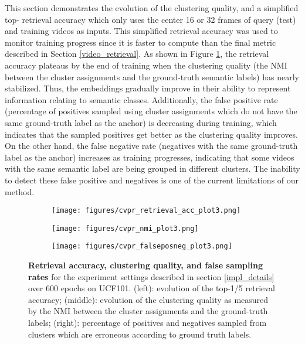 \documentclass[10pt,twocolumn,letterpaper]{article}
\begin{document}
\label{cluster_quality}
This section demonstrates the evolution of the clustering quality, and a simplified top- retrieval accuracy which only uses the center 16 or 32 frames of query (test) and training videos as inputs. This simplified retrieval accuracy was used to monitor training progress since it is faster to compute than the final metric described in Section \ref{video_retrieval}. As shown in Figure \ref{fig:training_nmi_curves}, the retrieval accuracy plateaus by the end of training when the clustering quality (the NMI between the cluster assignments and the ground-truth semantic labels) has nearly stabilized. Thus, the embeddings gradually improve in their ability to represent information relating to semantic classes. Additionally, the false positive rate (percentage of positives sampled using cluster assignments which do not have the same ground-truth label as the anchor) is decreasing during training, which indicates that the sampled positives get better as the clustering quality improves. On the other hand, the false negative rate (negatives with the same ground-truth label as the anchor) increases as training progresses, indicating that some videos with the same semantic label are being grouped in different clusters. The inability to detect these false positive and negatives is one of the current limitations of our method. 



\begin{figure}
\vspace{0.15cm}
\centering
\begin{subfigure}{0.155\textwidth}
  \centering
  \texttt{[image: figures/cvpr\_retrieval\_acc\_plot3.png]}
\end{subfigure}\begin{subfigure}{0.155\textwidth}
  \centering
  \texttt{[image: figures/cvpr\_nmi\_plot3.png]}
\end{subfigure}
\begin{subfigure}{0.155\textwidth}
  \centering
  \texttt{[image: figures/cvpr\_falseposneg\_plot3.png]}
\end{subfigure}
\vspace{-0.2cm}
\caption{\textbf{Retrieval accuracy, clustering quality, and false sampling rates} for the experiment settings described in section \ref{impl_details} over 600 epochs on UCF101. (left): evolution of the top-1/5 retrieval accuracy; (middle): evolution of the clustering quality as measured by the NMI between the cluster assignments and the ground-truth labels; (right): percentage of positives and negatives sampled from clusters which are erroneous according to ground truth labels.}
\label{fig:training_nmi_curves}
\vspace{-0.5cm}
\end{figure}
\end{document}
